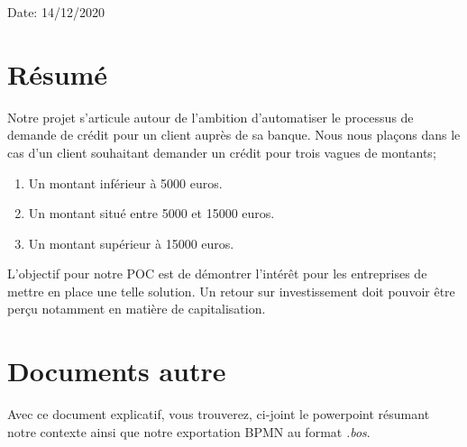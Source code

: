 \documentclass[a4paper,12pt,twoside]{article}
\begin{document}
\setcounter{footnote}{1}

\vspace*{2.8cm}

\begin{flushleft}
Date:  14/12/2020\\

\end{flushleft}


\baselineskip 17pt

\vspace*{1.5cm}


\vspace*{.05cm}


\renewcommand{\thefootnote}{\arabic{footnote}}

\setcounter{footnote}{1}

\pagebreak

\baselineskip 19pt



\tableofcontents

\newpage
\section{Résumé}

Notre projet s'articule autour de l'ambition d'automatiser le processus de demande de crédit pour un client auprès de sa banque. Nous nous plaçons dans le cas d'un client souhaitant demander un crédit pour trois vagues de montants;

\begin{enumerate}
 \item Un montant inférieur à 5000 euros.
 \item Un montant situé entre 5000 et 15000 euros.
 \item Un montant supérieur à 15000 euros.
\end{enumerate}

L'objectif pour notre POC est de démontrer l'intérêt pour les entreprises de mettre en place une telle solution. Un retour sur investissement doit pouvoir être perçu notamment en matière de capitalisation.  

\section{Documents autre}
 
Avec ce document explicatif, vous trouverez, ci-joint le powerpoint résumant notre contexte ainsi que notre exportation BPMN au format \emph{.bos}.
\end{document}
